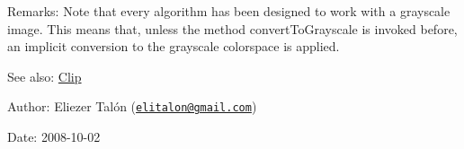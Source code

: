 \begin{Desc}
\item[Remarks:]Note that every algorithm has been designed to work with a grayscale image. This means that, unless the method convertToGrayscale is invoked before, an implicit conversion to the grayscale colorspace is applied.\end{Desc}
\begin{Desc}
\item[See also:]\hyperlink{class_clip}{Clip}\end{Desc}
\begin{Desc}
\item[Author:]Eliezer Talón (\href{mailto:elitalon@gmail.com}{\tt elitalon@gmail.com}) \end{Desc}
\begin{Desc}
\item[Date:]2008-10-02 \end{Desc}


